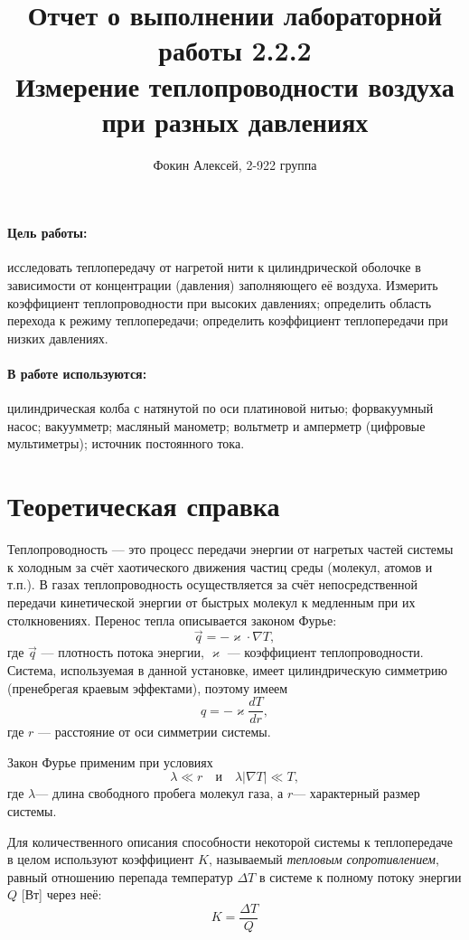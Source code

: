 \documentclass[12pt,a4paper]{article}
\title{
Отчет о выполнении лабораторной работы 2.2.2 \\
Измерение теплопроводности воздуха при разных давлениях
}
\author{Фокин Алексей, 2-922 группа}
\begin{document}
\maketitle

\paragraph{Цель работы:} исследовать теплопередачу от нагретой нити к цилиндрической оболочке в зависимости от концентрации (давления) заполняющего её воздуха. Измерить коэффициент теплопроводности при высоких давлениях; определить область перехода к режиму теплопередачи; определить коэффициент теплопередачи при низких давлениях.
\paragraph{В работе используются:}цилиндрическая колба с натянутой по оси платиновой нитью; форвакуумный насос; вакуумметр; масляный манометр; вольтметр и амперметр (цифровые мультиметры); источник постоянного тока.

\section{Теоретическая справка}
	Теплопроводность — это процесс передачи энергии от нагретых частей системы к холодным за счёт хаотического движения частиц среды (молекул, атомов и т.п.). В газах теплопроводность осуществляется за счёт непосредственной передачи кинетической энергии от быстрых молекул к медленным при их столкновениях. Перенос тепла описывается законом Фурье:
	\begin{equation}
		\vec{q} = -\varkappa\cdot\nabla T,
	\end{equation}
	где $\vec{q}$ --- плотность потока энергии, $\varkappa$ --- коэффициент теплопроводности. Система, используемая в данной установке, имеет цилиндрическую симметрию (пренебрегая краевым эффектами), поэтому имеем 
	\begin{equation}
		q = -\varkappa\frac{dT}{dr},
	\end{equation}
	где $r$ --- расстояние от оси симметрии системы.
	
	Закон Фурье применим при условиях $$\lambda\ll r\quad \text{и}\quad \lambda |\nabla T|\ll T, $$
	где $\lambda$--- длина свободного пробега молекул газа, а $r$--- характерный размер системы.
	
	Для количественного описания способности некоторой системы к теплопередаче в целом используют коэффициент $K$, называемый \emph{тепловым сопротивлением}, равный отношению перепада температур $\Delta T$ в системе к полному потоку энергии $Q$ [Вт] через неё:
	\begin{equation}
		K = \frac{\Delta T}{Q}
	\end{equation}
	
\end{document}
